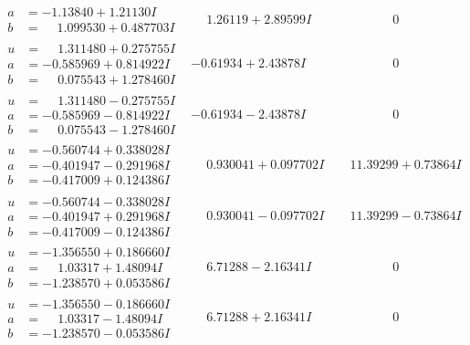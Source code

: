 \documentclass[1p]{elsarticle_modified}
\theoremstyle{definition}
\begin{document}
$$\begin{array}{c|c|c}
\begin{aligned}
a &= -1.13840 + 1.21130 I \\
b &= \phantom{-}1.099530 + 0.487703 I\end{aligned}
 & \phantom{-}1.26119 + 2.89599 I & \phantom{-0.000000 } 0 \\ \hline\begin{aligned}
u &= \phantom{-}1.311480 + 0.275755 I \\
a &= -0.585969 + 0.814922 I \\
b &= \phantom{-}0.075543 + 1.278460 I\end{aligned}
 & -0.61934 + 2.43878 I & \phantom{-0.000000 } 0 \\ \hline\begin{aligned}
u &= \phantom{-}1.311480 - 0.275755 I \\
a &= -0.585969 - 0.814922 I \\
b &= \phantom{-}0.075543 - 1.278460 I\end{aligned}
 & -0.61934 - 2.43878 I & \phantom{-0.000000 } 0 \\ \hline\begin{aligned}
u &= -0.560744 + 0.338028 I \\
a &= -0.401947 - 0.291968 I \\
b &= -0.417009 + 0.124386 I\end{aligned}
 & \phantom{-}0.930041 + 0.097702 I & \phantom{-}11.39299 + 0.73864 I \\ \hline\begin{aligned}
u &= -0.560744 - 0.338028 I \\
a &= -0.401947 + 0.291968 I \\
b &= -0.417009 - 0.124386 I\end{aligned}
 & \phantom{-}0.930041 - 0.097702 I & \phantom{-}11.39299 - 0.73864 I \\ \hline\begin{aligned}
u &= -1.356550 + 0.186660 I \\
a &= \phantom{-}1.03317 + 1.48094 I \\
b &= -1.238570 + 0.053586 I\end{aligned}
 & \phantom{-}6.71288 - 2.16341 I & \phantom{-0.000000 } 0 \\ \hline\begin{aligned}
u &= -1.356550 - 0.186660 I \\
a &= \phantom{-}1.03317 - 1.48094 I \\
b &= -1.238570 - 0.053586 I\end{aligned}
 & \phantom{-}6.71288 + 2.16341 I & \phantom{-0.000000 } 0\\

\end{array}$$
\end{document}
